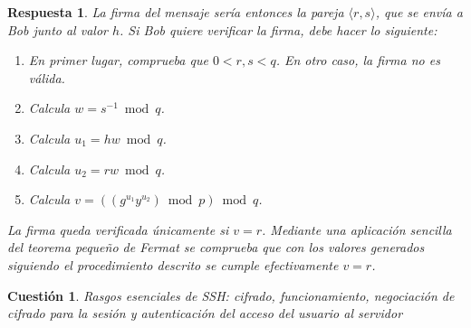 \documentclass[
  a4paper,
  spanish,
  12pt,
]{scrartcl}
\theoremstyle{ejercicio-style}
\newtheorem{ejer}{Cuestión}
\theoremstyle{remark-style}
\newtheorem*{sol}{Respuesta}
\theoremstyle{teorema-style}
\begin{document}
\begin{sol}
  La firma del mensaje sería entonces la pareja $\langle r, s \rangle$, que se envía a Bob junto al valor $h$. Si Bob quiere verificar la firma, debe hacer lo siguiente:
  \begin{enumerate}
      \item En primer lugar, comprueba que $0 < r, s < q$. En otro caso, la firma no es válida.
      \item Calcula $w=s^{-1} \bmod q$.
      \item Calcula $u_1 = hw \bmod q$.
      \item Calcula $u_2 = rw \bmod q$.
      \item Calcula $v = ((g^{u_1}y^{u_2}) \bmod p) \bmod q$.
  \end{enumerate}

  La firma queda verificada únicamente si $v=r$. Mediante una aplicación sencilla del \textit{teorema pequeño de Fermat} se comprueba que con los valores generados siguiendo el procedimiento descrito se cumple efectivamente $v=r$.
\end{sol}

\begin{ejer}
  Rasgos esenciales de SSH: cifrado, funcionamiento, negociación de cifrado para la sesión y autenticación del acceso del usuario al servidor
\end{ejer}
\end{document}
